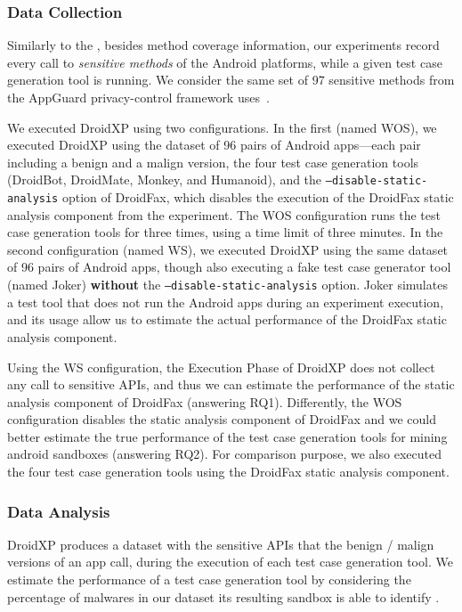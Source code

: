 \subsubsection{Data Collection}

Similarly to the \blls, besides
method coverage information, our experiments record every call
to \emph{sensitive methods} of the Android
platforms, while a given test case generation tool
is running. We consider the
same set of 97 sensitive methods 
from the AppGuard privacy-control framework
uses~\cite{DBLP:conf/esorics/BackesGHMS13}.

We executed DroidXP using two
configurations. In the first (named WOS), we executed DroidXP
using the dataset of 96 pairs of Android apps---each pair
including a benign and a malign version,
the four test case generation tools (DroidBot, DroidMate, Monkey, and Humanoid),
and the \texttt{--disable-static-analysis} option of
DroidFax, which disables the
execution of the DroidFax static analysis
component from the experiment. The WOS configuration
runs the test case generation tools for three times, using
a time limit of three minutes. 
In the second configuration (named WS), we executed DroidXP
using the same dataset of 96 pairs of Android apps, though 
also executing a fake test case generator tool (named Joker)
{\bf without} the \texttt{--disable-static-analysis} option.
Joker simulates a test tool that does not
run the Android apps during an experiment execution, and its usage
allow us to estimate the actual performance of the DroidFax static analysis component.

Using the WS configuration, the Execution Phase of
DroidXP does not collect any call to 
sensitive APIs, and thus we can estimate the performance of the
static analysis component of DroidFax (answering
RQ1).
Differently, the WOS configuration
disables the static analysis component of DroidFax and
we could better estimate the true performance of the test
case generation tools for mining android sandboxes 
(answering RQ2). For comparison purpose, we also
executed the four test case generation tools using the
DroidFax static analysis component. 


\subsubsection{Data Analysis} 

DroidXP produces a
dataset with the sensitive
APIs that the benign / malign
versions of an app call, during
the execution of each test case
generation tool. We estimate the
performance of a test case generation
tool by considering the percentage of
malwares in our dataset
its resulting sandbox is able to identify .

